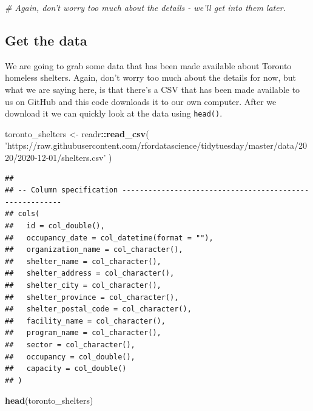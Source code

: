 \documentclass[
]{book}
\newenvironment{Shaded}{\begin{snugshade}}{\end{snugshade}}
\newcommand{\CommentTok}[1]{\textcolor[rgb]{0.56,0.35,0.01}{\textit{#1}}}
\newcommand{\KeywordTok}[1]{\textcolor[rgb]{0.13,0.29,0.53}{\textbf{#1}}}
\newcommand{\NormalTok}[1]{#1}
\newcommand{\OperatorTok}[1]{\textcolor[rgb]{0.81,0.36,0.00}{\textbf{#1}}}
\newcommand{\StringTok}[1]{\textcolor[rgb]{0.31,0.60,0.02}{#1}}
\begin{document}
\begin{Shaded}
\begin{Highlighting}[]
\CommentTok{# Again, don't worry too much about the details - we'll get into them later.}
\end{Highlighting}
\end{Shaded}

\hypertarget{get-the-data-1}{%
\subsection{Get the data}\label{get-the-data-1}}

We are going to grab some data that has been made available about Toronto homeless shelters. Again, don't worry too much about the details for now, but what we are saying here, is that there's a CSV that has been made available to us on GitHub and this code downloads it to our own computer. After we download it we can quickly look at the data using \texttt{head()}.

\begin{Shaded}
\begin{Highlighting}[]
\NormalTok{toronto_shelters <-}\StringTok{ }
\StringTok{  }\NormalTok{readr}\OperatorTok{::}\KeywordTok{read_csv}\NormalTok{(}
    \StringTok{'https://raw.githubusercontent.com/rfordatascience/tidytuesday/master/data/2020/2020-12-01/shelters.csv'}
\NormalTok{    )}
\end{Highlighting}
\end{Shaded}

\begin{verbatim}
## 
## -- Column specification --------------------------------------------------------
## cols(
##   id = col_double(),
##   occupancy_date = col_datetime(format = ""),
##   organization_name = col_character(),
##   shelter_name = col_character(),
##   shelter_address = col_character(),
##   shelter_city = col_character(),
##   shelter_province = col_character(),
##   shelter_postal_code = col_character(),
##   facility_name = col_character(),
##   program_name = col_character(),
##   sector = col_character(),
##   occupancy = col_double(),
##   capacity = col_double()
## )
\end{verbatim}

\begin{Shaded}
\begin{Highlighting}[]
\KeywordTok{head}\NormalTok{(toronto_shelters)}
\end{Highlighting}
\end{Shaded}
\end{document}
